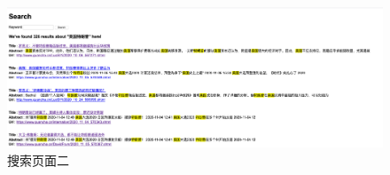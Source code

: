 \documentclass[UTF8]{ctexart}
\begin{document}
        \begin{figure}[ht]
            \centering
            \includegraphics[scale=0.18]{img/result2.png}
            \caption{搜索页面二}
        \end{figure}
\end{document}
